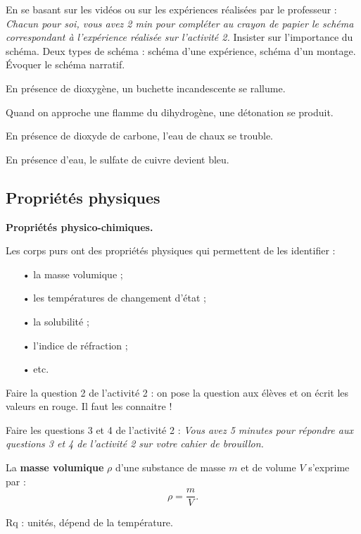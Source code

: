\begin{prior}
En se basant sur les vidéos ou sur les expériences réalisées par le professeur : \emph{Chacun pour soi, vous avez 2 min pour compléter au crayon de papier le schéma correspondant à l'expérience réalisée sur l'activité 2.}
Insister sur l'importance du schéma.
Deux types de schéma : schéma d'une expérience, schéma d'un montage.
Évoquer le schéma narratif.
\end{prior}

En présence de dioxygène, un buchette incandescente se rallume.

Quand on approche une flamme du dihydrogène, une détonation se produit.

En présence de dioxyde de carbone, l'eau de chaux se trouble.

En présence d'eau, le sulfate de cuivre devient bleu.

\subsection{Propriétés physiques}

\begin{slide}
\textbf{Propriétés physico-chimiques.}
\end{slide}

Les corps purs ont des propriétés physiques qui permettent de les identifier :
\begin{itemize}
\item[•] la masse volumique ;
\item[•] les températures de changement d'état ;
\item[•] la solubilité ;
\item[•] l'indice de réfraction ;
\item[•] etc.
\end{itemize}

\begin{prior}
Faire la question 2 de l'activité 2 : on pose la question aux élèves et on écrit les valeurs en rouge.
Il faut les connaitre !
\end{prior}

\begin{prior}
Faire les questions 3 et 4 de l'activité 2 : \emph{Vous avez 5 minutes pour répondre aux questions 3 et 4 de l'activité 2 sur votre cahier de brouillon.}
\end{prior}

\begin{definition}
La \textbf{masse volumique} $\rho$ d'une substance de masse $m$ et de volume $V$ s'exprime par :
\begin{equation}
\rho = \frac{m}{V}.
\nonumber
\end{equation}
\end{definition}
Rq : unités, dépend de la température.

